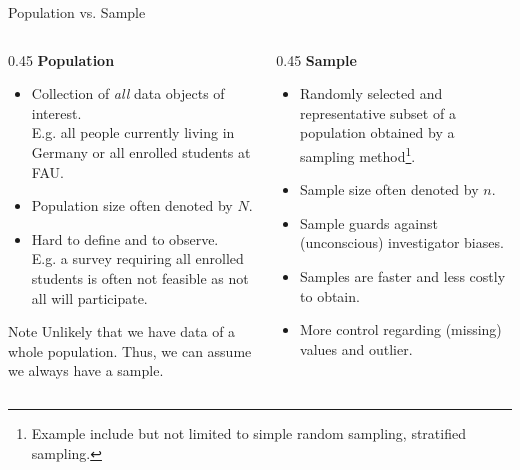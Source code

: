 \begin{frame}{Population vs. Sample}
	\begin{columns}[t]
		\begin{column}{0.45\columnwidth}
			\centering \textbf{Population}
			\begin{itemize}
				\item Collection of \textit{all} data objects of interest.\\ E.g. all
				      people currently living in Germany or all enrolled students at FAU.
				\item Population size often denoted by $N$.
				\item Hard to define and to observe.\\E.g. a survey requiring all enrolled
				      students is often not feasible as not all will participate.
			\end{itemize}
			\begin{alertblock}{Note}
				Unlikely that we have data of a whole population. Thus, we can assume we
				always have a sample.
			\end{alertblock}
		\end{column}
		\begin{column}{0.45\columnwidth}
			\centering \textbf{Sample}
			\begin{itemize}
				\item Randomly selected and representative subset of a population obtained
				      by a sampling method\footnote[frame]{Example include but not limited to
					      simple random sampling, stratified sampling.}.
				\item Sample size often denoted by $n$.
				\item Sample guards against (unconscious) investigator biases.
				\item Samples are faster and less costly to obtain.
				\item More control regarding (missing) values and outlier.
			\end{itemize}
		\end{column}
	\end{columns}
\end{frame}

